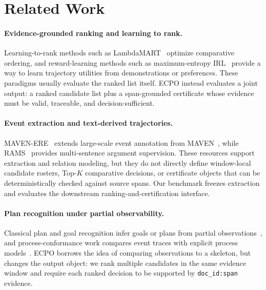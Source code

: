 \documentclass{article}
\begin{document}
\section{Related Work}
\label{sec:related-work}

\paragraph{Evidence-grounded ranking and learning to rank.}
Learning-to-rank methods such as LambdaMART~\citep{burges_ranknet_2010} optimize comparative ordering, and reward-learning methods such as maximum-entropy IRL~\citep{ziebart_maximum_2008} provide a way to learn trajectory utilities from demonstrations or preferences. These paradigms usually evaluate the ranked list itself. ECPO instead evaluates a joint output: a ranked candidate list plus a span-grounded certificate whose evidence must be valid, traceable, and decision-sufficient.

\paragraph{Event extraction and text-derived trajectories.}
MAVEN-ERE~\citep{wang_maven-ere_2022} extends large-scale event annotation from MAVEN~\citep{wang_maven_2020}, while RAMS~\citep{ebner_multi-sentence_2020} provides multi-sentence argument supervision. These resources support extraction and relation modeling, but they do not directly define window-local candidate rosters, Top-$K$ comparative decisions, or certificate objects that can be deterministically checked against source spans. Our benchmark freezes extraction and evaluates the downstream ranking-and-certification interface.

\paragraph{Plan recognition under partial observability.}
Classical plan and goal recognition infer goals or plans from partial observations~\citep{ramirez_plan_2009,ramirez_probabilistic_2010}, and process-conformance work compares event traces with explicit process models~\citep{brockhoff_process_2021,park_realizing_2021}. ECPO borrows the idea of comparing observations to a skeleton, but changes the output object: we rank multiple candidates in the same evidence window and require each ranked decision to be supported by \texttt{doc\_id:span} evidence.
\end{document}
